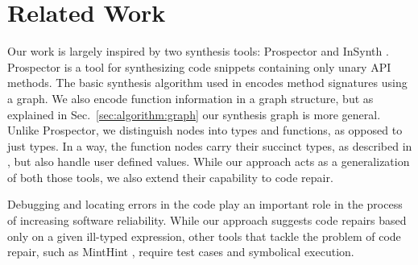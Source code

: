 \section{Related Work}
\label{sec:related}

Our work is largely inspired by two synthesis tools: Prospector
\cite{MandelinetALL2005Jungloid} and InSynth
\cite{GveroETAL13CompleteCompletionTypesWeights,
  DBLP:conf/cav/GveroKP11}. Prospector is a tool for synthesizing code
snippets containing only unary API methods. The basic synthesis
algorithm used in \cite{MandelinetALL2005Jungloid} encodes method
signatures using a graph. We also encode function information in a
graph structure, but as explained in Sec.~\ref{sec:algorithm:graph}
our synthesis graph is more general. Unlike Prospector, we distinguish
nodes into types and functions, as opposed to just types. In a way,
the function nodes carry their succinct types, as described in
\cite{GveroETAL13CompleteCompletionTypesWeights}, but also handle user
defined values. While our approach acts as a generalization of both
those tools, we also extend their capability to code repair.

Debugging and locating errors in the code \cite{Pavlinovic:2014,
  Chandra:2011:AD} play an important role in the process of increasing
software reliability. While our approach suggests code repairs based only on a given ill-typed expression, other tools that tackle the problem of code repair, such
as MintHint \cite{MintHint}, require test cases and symbolical execution.

